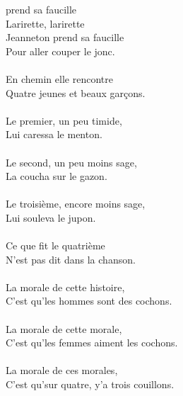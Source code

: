 % 
 prend sa faucille
\\Larirette, larirette
\\Jeanneton prend sa faucille
\\Pour aller couper le jonc. ~\bissimple
\\\\En chemin elle rencontre
\\Quatre jeunes et beaux garçons.~~~~~~~~ \bissimple
\\\\Le premier, un peu timide,
\\Lui caressa le menton. ~~~~~~~~~~~~~~~~~~~~~\bissimple
\\\\Le second, un peu moins sage,
\\La coucha sur le gazon. ~~~~~~~~~~~~~~~~~~~~\bissimple
\\\\Le troisième, encore moins sage,
\\Lui souleva le jupon. ~~~~~~~~~~~~~~~~~~~~~~~~~\bissimple
\\\\Ce que fit le quatrième
\\N'est pas dit dans la chanson. ~~~~~~~~~~~~~\bissimple
\\\\La morale de cette histoire,
\\C'est qu'les hommes sont des cochons. ~~\bissimple
\\\\La morale de cette morale,
\\C'est qu'les femmes aiment les cochons. ~\bissimple
\\\\La morale de ces morales,
\\C'est qu'sur quatre, y'a trois couillons. ~~~\bissimple
\\\\
\\\\
\\
\breakpage